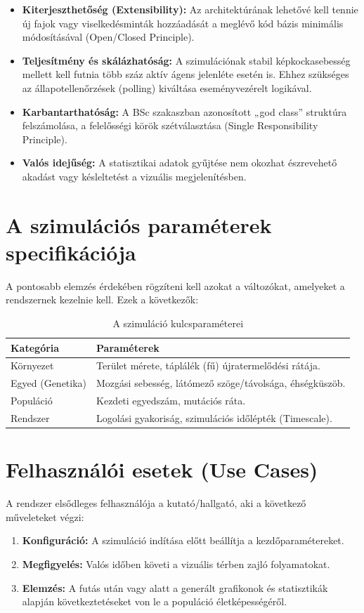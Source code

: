 \begin{itemize}
    \item \textbf{Kiterjeszthetőség (Extensibility):} Az architektúrának lehetővé kell tennie új fajok vagy viselkedésminták hozzáadását a meglévő kód bázis minimális módosításával (Open/Closed Principle).
    \item \textbf{Teljesítmény és skálázhatóság:} A szimulációnak stabil képkockasebesség mellett kell futnia több száz aktív ágens jelenléte esetén is. Ehhez szükséges az állapotellenőrzések (polling) kiváltása eseményvezérelt logikával.
    \item\textbf{Karbantarthatóság:} A BSc szakaszban azonosított „god class” struktúra felszámolása, a felelősségi körök szétválasztása (Single Responsibility Principle).
    \item \textbf{Valós idejűség:} A statisztikai adatok gyűjtése nem okozhat észrevehető akadást vagy késleltetést a vizuális megjelenítésben.
\end{itemize}

\section{A szimulációs paraméterek specifikációja}

A pontosabb elemzés érdekében rögzíteni kell azokat a változókat, amelyeket a rendszernek kezelnie kell. Ezek a következők:

\begin{table}[h!]
\centering
\begin{tabular}{|l|l|}
\hline
\textbf{Kategória} & \textbf{Paraméterek} \\ \hline
Környezet & Terület mérete, táplálék (fű) újratermelődési rátája. \\ \hline
Egyed (Genetika) & Mozgási sebesség, látómező szöge/távolsága, éhségküszöb. \\ \hline
Populáció & Kezdeti egyedszám, mutációs ráta. \\ \hline
Rendszer & Logolási gyakoriság, szimulációs időlépték (Timescale). \\ \hline
\end{tabular}
\caption{A szimuláció kulcsparaméterei}
\label{table:parameters}
\end{table}

\section{Felhasználói esetek (Use Cases)}

A rendszer elsődleges felhasználója a kutató/hallgató, aki a következő műveleteket végzi:
\begin{enumerate}
	\item  \textbf{Konfiguráció:} A szimuláció indítása előtt beállítja a kezdőparamétereket.
	\item \textbf{Megfigyelés:} Valós időben követi a vizuális térben zajló folyamatokat.
	\item \textbf{Elemzés:} A futás után vagy alatt a generált grafikonok és statisztikák alapján következtetéseket von le a populáció életképességéről.
\end{enumerate}
